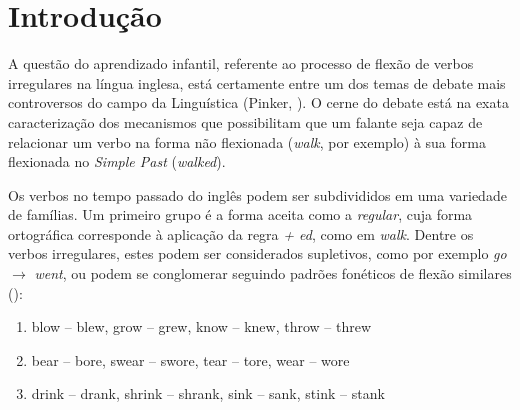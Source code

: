 \chapter{Introdução}
\label{ch:01}

A questão do aprendizado infantil, referente ao processo de flexão de verbos irregulares na língua inglesa, está certamente entre um dos temas de debate mais controversos %
do campo da Linguística (Pinker, \citeyear{Pinker:1999}). O cerne do debate está na exata caracterização dos mecanismos que possibilitam que um falante seja capaz de relacionar um verbo na forma não flexionada (\textit{walk}, por exemplo) à sua forma flexionada no \textit{Simple Past} (\textit{walked}).

Os verbos no tempo passado do inglês podem ser subdivididos em uma variedade de famílias. Um primeiro grupo é a forma aceita como a \textit{regular}, cuja forma ortográfica corresponde à aplicação da regra \textit{ + ed}, como em \textit{walk}. %
Dentre os verbos irregulares, estes podem ser considerados supletivos, como por exemplo \textit{go} $\rightarrow$ \textit{went}, ou podem se conglomerar seguindo padrões fonéticos de flexão similares (\cite{Nelson:2010}):

\begin{enumerate}
    \item blow – blew, grow – grew, know – knew, throw – threw
    \item bear – bore, swear – swore, tear – tore, wear – wore
    \item drink – drank, shrink – shrank, sink – sank, stink – stank 
\end{enumerate}

